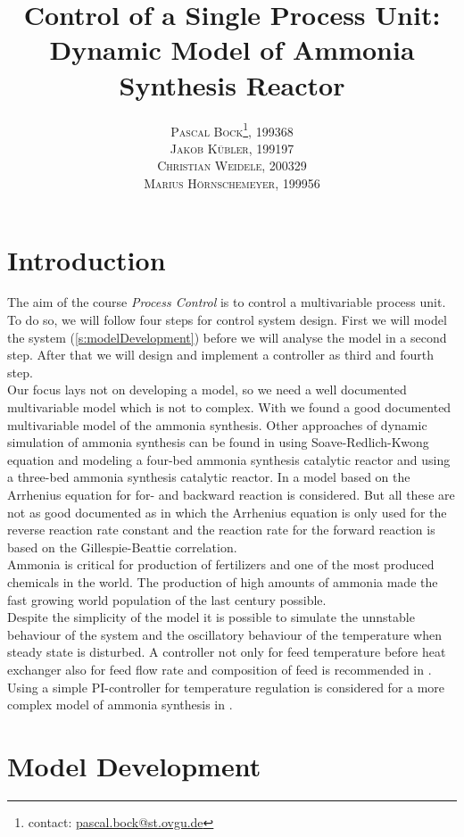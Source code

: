 \documentclass[paper=letter, fontsize=12pt]{article}
\title{\vspace{-15mm}\fontsize{24pt}{10pt}\selectfont\textbf{Control of a Single Process Unit: Dynamic Model of Ammonia Synthesis Reactor}} %
\author{
\large
{\textsc{Pascal Bock\footnote{contact: \href{mailto:pascal.bock@st.ovgu.de}{pascal.bock@st.ovgu.de}}, 199368 }}\\[2mm]
{\textsc{Jakob Kübler, 199197 }}\\[2mm]
{\textsc{Christian Weidele, 200329 }}\\[2mm]
{\textsc{Marius Hörnschemeyer, 199956 }}\\[2mm]
}
\date{}
\begin{document}
\maketitle %
\thispagestyle{fancy} %


\section{Introduction}
The aim of the course \emph{Process Control} is to control a multivariable process unit. To do so, we will follow four steps for control system design. First we will model the system (\autoref{s:modelDevelopment}) before we will analyse the model in a second step. After that we will design and implement a controller as third and fourth step. \\
Our focus lays not on developing a model, so we need a well documented multivariable model which is not to complex. With \cite{Jinasena2016} we found a good documented multivariable model of the ammonia synthesis. Other approaches of dynamic simulation of ammonia synthesis can be found in \cite{Kasiri2003} using Soave-Redlich-Kwong equation and modeling a four-bed ammonia synthesis catalytic reactor and \cite{Mancusi2009} using a three-bed ammonia synthesis catalytic reactor. In \cite{Morud1998} a model based on the Arrhenius equation for for- and backward reaction is considered. But all these are not as good documented as \cite{Jinasena2016} in which the Arrhenius equation is only used for the reverse reaction rate constant and the reaction rate for the forward reaction is based on the Gillespie-Beattie correlation.\\
Ammonia is critical for production of fertilizers and one of the most produced chemicals in the world. The production of high amounts of ammonia made the fast growing world population of the last century possible. \cite{Pattabathula2016} \\
Despite the simplicity of the model it is possible to simulate the unnstable behaviour of the system and the oscillatory behaviour of the temperature when steady state is disturbed. A controller not only for feed temperature before heat exchanger also for feed flow rate and composition of feed is recommended in \cite{Jinasena2016}. Using a simple PI-controller for temperature regulation is considered for a more complex model of ammonia synthesis in \cite{Morud1998}.


\section{Model Development} \label{s:modelDevelopment}
\end{document}
